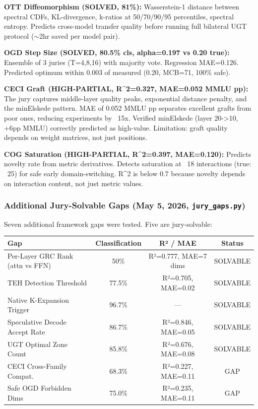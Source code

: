 \documentclass[11pt]{article}
\begin{document}
\textbf{OTT Diffeomorphism (SOLVED, 81\%):} Wasserstein-1 distance between spectral CDFs, KL-divergence, k-ratios at 50/70/90/95 percentiles, spectral entropy. Predicts cross-model transfer quality before running full bilateral UGT protocol ($\sim$2hr saved per model pair).

\textbf{OGD Step Size (SOLVED, 80.5\% cls, alpha=0.197 vs 0.20 true):} Ensemble of 3 juries (T=4,8,16) with majority vote. Regression MAE=0.126. Predicted optimum within 0.003 of measured (0.20, MCB=71, 100\% safe).

\textbf{CECI Graft (HIGH-PARTIAL, R^2=0.327, MAE=0.052 MMLU pp):} The jury captures middle-layer quality peaks, exponential distance penalty, and the minElskede pattern. MAE of 0.052 MMLU pp separates excellent grafts from poor ones, reducing experiments by ~15x. Verified minElskede (layer 20->10, +6pp MMLU) correctly predicted as high-value. Limitation: graft quality depends on weight matrices, not just positions.

\textbf{COG Saturation (HIGH-PARTIAL, R^2=0.397, MAE=0.120):} Predicts novelty rate from metric derivatives. Detects saturation at ~18 interactions (true: ~25) for safe early domain-switching. R^2 is below 0.7 because novelty depends on interaction content, not just metric values.

\subsubsection*{Additional Jury-Solvable Gaps (May 5, 2026, \texttt{jury\_gaps.py})}

Seven additional framework gaps were tested. Five are jury-solvable:

\begin{center}
\begin{tabular}{lccc}
\toprule
\textbf{Gap} & \textbf{Classification} & \textbf{R² / MAE} & \textbf{Status} \\
\midrule
Per-Layer GRC Rank (attn vs FFN) & 50\% & R²=0.777, MAE=7 dims & SOLVABLE \\
TEH Detection Threshold & 77.5\% & R²=0.705, MAE=0.02 & SOLVABLE \\
Native K-Expansion Trigger & 96.7\% & --- & SOLVABLE \\
Speculative Decode Accept Rate & 86.7\% & R²=0.846, MAE=0.05 & SOLVABLE \\
UGT Optimal Zone Count & 85.8\% & R²=0.676, MAE=0.08 & SOLVABLE \\
CECI Cross-Family Compat. & 68.3\% & R²=0.227, MAE=0.11 & GAP \\
Safe OGD Forbidden Dims & 75.0\% & R²=0.235, MAE=0.11 & GAP \\
\bottomrule
\end{tabular}
\end{center}
\end{document}
